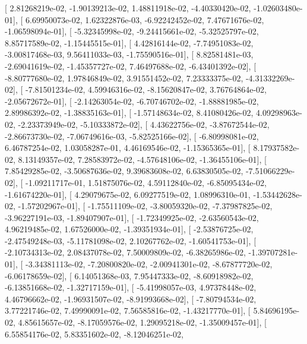 \documentclass{article}
\begin{document}
       [  2.81268219e-02,  -1.90139213e-02,   1.48811918e-02,
         -4.40330420e-02,  -1.02603480e-01],
       [  6.69950073e-02,   1.62322876e-03,  -6.92242452e-02,
          7.47671676e-02,  -1.06598094e-01],
       [ -5.32345998e-02,  -9.24415661e-02,  -5.32525797e-02,
          8.85717589e-02,  -1.15445515e-01],
       [  4.42816144e-02,  -7.74951083e-02,  -3.00817468e-03,
          9.56411033e-03,  -1.75590516e-01],
       [  8.82581481e-03,  -2.69041619e-02,  -1.45357727e-02,
          7.46497688e-02,  -6.43401392e-02],
       [ -8.80777680e-02,   1.97846849e-02,   3.91551452e-02,
          7.23333375e-02,  -4.31332269e-02],
       [ -7.81501234e-02,   4.59946316e-02,  -8.15620847e-02,
          3.76764864e-02,  -2.05672672e-01],
       [ -2.14263054e-02,  -6.70746702e-02,  -1.88881985e-02,
          2.89986392e-02,  -1.38835163e-01],
       [ -1.57148634e-02,   8.41080426e-02,   4.09298963e-02,
         -2.23373949e-02,  -5.10333872e-02],
       [  4.43622756e-02,  -3.87672544e-02,  -2.86673730e-02,
         -7.06749616e-03,  -5.82525166e-02],
       [ -6.80998081e-02,   6.46787254e-02,   1.03058287e-01,
          4.46169546e-02,  -1.15365365e-01],
       [  8.17937582e-02,   8.13149357e-02,   7.28583972e-02,
         -4.57648106e-02,  -1.36455106e-01],
       [  7.85429285e-02,  -3.50687636e-02,   9.39683608e-02,
          6.63830505e-02,  -7.51066229e-02],
       [ -1.09211717e-01,   1.51875076e-02,   4.59112840e-02,
         -6.85095434e-02,  -1.61674220e-01],
       [  4.29079675e-02,   6.09277519e-02,   1.08996310e-01,
         -1.53442628e-02,  -1.57202967e-01],
       [ -1.75511109e-02,  -3.80059320e-02,  -7.37987825e-02,
         -3.96227191e-03,  -1.89407907e-01],
       [ -1.72349925e-02,  -2.63560543e-02,   4.96219485e-02,
          1.67526000e-02,  -1.39351934e-01],
       [ -2.53876725e-02,  -2.47549248e-03,  -5.11781098e-02,
          2.10267762e-02,  -1.60541753e-01],
       [ -2.10734313e-02,   2.08437078e-02,   7.50009809e-02,
         -6.38265986e-02,  -1.39707281e-01],
       [ -3.34381113e-02,  -7.20800820e-02,  -2.00941301e-02,
         -8.67877720e-02,  -6.06178659e-02],
       [  6.14051368e-03,   7.95447333e-02,  -8.60918982e-02,
         -6.13851668e-02,  -1.32717159e-01],
       [ -5.41998057e-03,   4.97378448e-02,   4.46796662e-02,
         -1.96931507e-02,  -8.91993668e-02],
       [ -7.80794534e-02,   3.77221746e-02,   7.49990091e-02,
          7.56585816e-02,  -1.43217770e-01],
       [  5.84696195e-02,   4.85615657e-02,  -8.17059576e-02,
          1.29095218e-02,  -1.35009457e-01],
       [  6.55854176e-02,   5.83351602e-02,  -8.12046251e-02,
\end{document}
